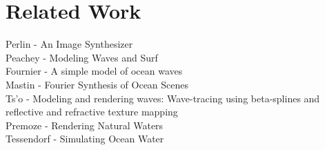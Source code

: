 \chapter{Related Work}
\label{ch:state_of_the_art}

Perlin - An Image Synthesizer \cite{Perlin:1985}\\
Peachey - Modeling Waves and Surf \cite{Peachey:1986}\\
Fournier - A simple model of ocean waves \cite{Fournier:1986}\\
Mastin - Fourier Synthesis of Ocean Scenes \cite{Mastin:1987}\\
Ts'o - Modeling and rendering waves: Wave-tracing using beta-splines and reflective and refractive texture mapping \cite{Ts'o:1987}\\
Premoze - Rendering Natural Waters \cite{Premoze:2000} \\
Tessendorf - Simulating Ocean Water \cite{course:simulatingocean}

